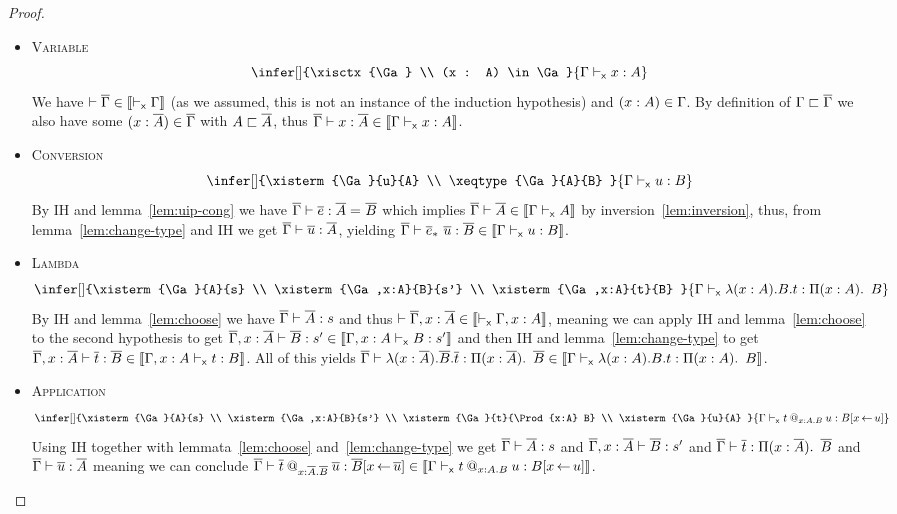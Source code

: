\begin{proof}
\begin{itemize}
    \item \textsc{Variable}
    \[
      \infer[]
        {\xisctx{\Ga} \\
         (x : A) \in \Ga
        }
        {\xisterm{\Ga}{x}{A}}
    \]
    We have $\vdash \overline{\Gamma} \in \llbracket \vdash_{\mathsf{x}} \Gamma \rrbracket$ (as we assumed, this is not
    an instance of the induction hypothesis) and $(x : A) \in \Gamma$.
    By definition of $\Gamma \sqsubset \overline{\Gamma}$ we also have some $(x : \overline{A}) \in \overline{\Gamma}$
    with $A \sqsubset \overline{A}$, thus
    $\overline{\Gamma} \vdash x : \overline{A} \in \llbracket \Gamma \vdash_{\mathsf{x}} x : A \rrbracket$.

    \item \textsc{Conversion}
    \[
      \infer[]
        {\xisterm{\Ga}{u}{A} \\
         \xeqtype{\Ga}{A}{B}
        }
        {\xisterm{\Ga}{u}{B}}
    \]
    By IH and lemma~\ref{lem:uip-cong} we have
    $\overline{\Gamma} \vdash \overline{e} : \overline{A} =_{} \overline{B}$ which implies
    $\overline{\Gamma} \vdash \overline{A} \in \llbracket \Gamma \vdash_{\mathsf{x}} A \rrbracket$ by
    inversion~\eqref{lem:inversion}, thus, from lemma~\ref{lem:change-type}
    and IH we get $\overline{\Gamma} \vdash \overline{u} : \overline{A}$, yielding
    $\overline{\Gamma} \vdash \overline{e}_*\ \overline{u} : \overline{B} \in \llbracket \Gamma \vdash_{\mathsf{x}} u : B \rrbracket$.

    \item \textsc{Lambda}
    \[
      \infer[]
        {\xisterm{\Ga}{A}{s} \\
         \xisterm{\Ga,x:A}{B}{s'} \\
         \xisterm{\Ga,x:A}{t}{B}
        }
        {\xisterm{\Ga}{\lam{x:A}{B} t}{\Prod{x:A} B}}
    \]
    By IH and lemma~\ref{lem:choose} we have $\overline{\Gamma} \vdash \overline{A} : s$ and thus
    $\vdash \overline{\Gamma}, x:\overline{A} \in \llbracket \vdash_{\mathsf{x}} \Gamma,x:A \rrbracket$, meaning we can apply IH
    and lemma~\ref{lem:choose} to the second hypothesis to get
    $\overline{\Gamma},x:\overline{A} \vdash \overline{B} : s' \in \llbracket \Gamma,x:A \vdash_{\mathsf{x}} B : s' \rrbracket$ and then
    IH and lemma~\ref{lem:change-type} to get
    $\overline{\Gamma},x:\overline{A} \vdash \overline{t} : \overline{B} \in \llbracket \Gamma,x:A \vdash_{\mathsf{x}} t : B \rrbracket$.
    All of this yields
    $\overline{\Gamma} \vdash \lambda (x:\overline{A}). \overline{B} . \overline{t} : \mathop{\Pi(x:\overline{A}).\ } \overline{B}
    \in \llbracket \Gamma \vdash_{\mathsf{x}} \lambda (x:A). B . t : \mathop{\Pi(x:A).\ } B \rrbracket$.

    \item \textsc{Application}
    \[
      \infer[]
        {\xisterm{\Ga}{A}{s} \\
         \xisterm{\Ga,x:A}{B}{s'} \\
         \xisterm{\Ga}{t}{\Prod{x:A} B} \\
         \xisterm{\Ga}{u}{A}
        }
        {\xisterm{\Ga}{\app{t}{x:A}{B}{u}}{B[x \sto u]}}
    \]
    Using IH together with lemmata~\ref{lem:choose} and~\ref{lem:change-type}
    we get $\overline{\Gamma} \vdash \overline{A} : s$ and $\overline{\Gamma},x:\overline{A} \vdash \overline{B} : s'$ and
    $\overline{\Gamma} \vdash \overline{t} : \mathop{\Pi(x:\overline{A}).\ } \overline{B}$ and $\overline{\Gamma} \vdash \overline{u} : \overline{A}$
    meaning we can conclude
    $\overline{\Gamma} \vdash \overline{t}\mathbin{@_{x:\overline{A}.\overline{B}}} \overline{u} : \overline{B}[x \mathop{\leftarrow} \overline{u}]
    \in \llbracket \Gamma \vdash_{\mathsf{x}} t\mathbin{@_{x:A.B}} u : B[x \mathop{\leftarrow} u] \rrbracket$.


\end{itemize}
\end{proof}
